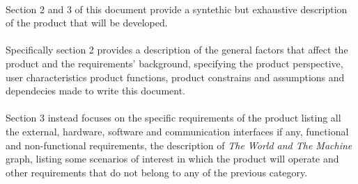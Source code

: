 		\paragraph*{}Section 2 and 3 of this document provide a syntethic but exhaustive description of the product that will be developed.		
		\paragraph*{}Specifically section 2 provides a description of the general factors that affect the product and the requirements' background, specifying the product perspective, user characteristics product functions, product constrains and assumptions and dependecies made to write this document.
		\paragraph*{}Section 3 instead focuses on the specific requirements of the product listing all the external, hardware, software and communication interfaces if any, functional and non-functional requirements, the description of \emph{The World and The Machine} graph, listing some scenarios of interest in which the product will operate and other requirements that do not belong to any of the previous category. 
	
	